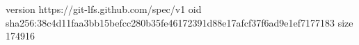 version https://git-lfs.github.com/spec/v1
oid sha256:38c4d11faa3bb15befcc280b35fe46172391d88e17afcf37f6ad9e1ef7177183
size 174916
